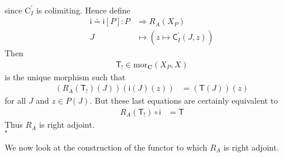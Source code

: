 \begin{prf}
\begin{align*}
\end{align*}
since $\mathrm{C}_{I}^{\prime}$ is colimiting. Hence define
\begin{align*}
  \mathsf{i}
  \doteq
  \mathsf{i}[P]
  \colon
  P
  &\Rightarrow
  R_{A}(X_{P})
  \\
  J
  &\mapsto
  \left(
    z
    \mapsto
    \mathsf{C}_{I}^{\prime}(J,z)
  \right)
\end{align*}
Then
\begin{align*}
  \mathsf{T}_{!}
  \in
  \mathrm{mor}_{\mathbf{C}}(X_{P},X)
\end{align*}
is the unique morphism such that
\begin{align*}
  \left(
    R_{A}(\mathsf{T}_{!})(J)
  \right)
  \left(
    \mathsf{i}(J)(z)
  \right)
  &=
  (\mathsf{T}(J))(z)
\end{align*}
for all $J$ and $z \in P(J)$. But these last equations are certainly equivalent to
\begin{align*}
  R_{A}(\mathsf{T}_{!})
  \circ
  \mathsf{i}
  &=
  \mathsf{T}
\end{align*}
Thus $R_{A}$ is right adjoint.
\\
\phantom{proven}
\hfill
$\square$
\end{prf}
We now look at the construction of the functor to which $R_{A}$ is right adjoint.
\\
